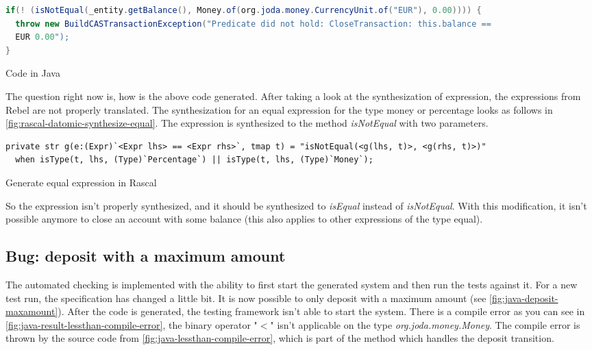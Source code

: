 \begin{sourcecode}[h!]
\begin{lstlisting}[language=Java]
if(! (isNotEqual(_entity.getBalance(), Money.of(org.joda.money.CurrencyUnit.of("EUR"), 0.00)))) {
  throw new BuildCASTransactionException("Predicate did not hold: CloseTransaction: this.balance == 
  EUR 0.00");
}
\end{lstlisting}
\caption{Code in Java}
\label{fig:java-notequal-check}
\end{sourcecode}

The question right now is, how is the above code generated.  After taking a look at the synthesization of expression, the expressions from Rebel are not properly translated. The synthesization for an equal expression for the type money or percentage looks as follows in \autoref{fig:rascal-datomic-synthesize-equal}. The expression is synthesized to the method \textit{isNotEqual} with two parameters. 

\begin{sourcecode}[h!]
\begin{lstlisting}[]
private str g(e:(Expr)`<Expr lhs> == <Expr rhs>`, tmap t) = "isNotEqual(<g(lhs, t)>, <g(rhs, t)>)" 
  when isType(t, lhs, (Type)`Percentage`) || isType(t, lhs, (Type)`Money`);
\end{lstlisting}
\caption{Generate equal expression in Rascal}
\label{fig:rascal-datomic-synthesize-equal}
\end{sourcecode}

So the expression isn't properly synthesized, and it should be synthesized to \textit{isEqual} instead of \textit{isNotEqual}. With this modification, it isn't possible anymore to close an account with some balance (this also applies to other expressions of the type equal).

\subsection{Bug: deposit with a maximum amount}
\label{sec:bug-compile-max-deposit}

The automated checking is implemented with the ability to first start the generated system and then run the tests against it. For a new test run, the specification has changed a little bit. It is now possible to only deposit with a maximum amount (see \autoref{fig:java-deposit-maxamount}). After the code is generated, the testing framework isn't able to start the system. There is a compile error as you can see in \autoref{fig:java-result-lessthan-compile-error}, the binary operator "$<$" isn't applicable on the type \textit{org.joda.money.Money}. The compile error is thrown by the source code from \autoref{fig:java-lessthan-compile-error}, which is part of the method which handles the deposit transition.

